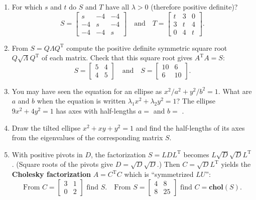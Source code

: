 \documentclass[14pt, a4paper]{article}
\begin{document}
\begin{enumerate}[resume]
    \item For which $s$ and $t$ do $S$ and $T$ have all $\lambda > 0$ (therefore positive definite)?
          \[
              S = \begin{bmatrix} s & -4 & -4 \\ -4 & s & -4 \\ -4 & -4 & s \end{bmatrix} \quad \text{and} \quad T = \begin{bmatrix} t & 3 & 0 \\ 3 & t & 4 \\ 0 & 4 & t \end{bmatrix}.
          \]

    \item From $S = Q\Lambda Q^{\mathrm{T}}$ compute the positive definite symmetric square root $Q\sqrt{\Lambda}Q^{\mathrm{T}}$ of each matrix. Check that this square root gives $A^{\mathrm{T}}A = S$:
          \[
              S = \begin{bmatrix} 5 & 4 \\ 4 & 5 \end{bmatrix} \quad \text{and} \quad S = \begin{bmatrix} 10 & 6 \\ 6 & 10 \end{bmatrix}.
          \]

    \item You may have seen the equation for an ellipse as $x^2/a^2 + y^2/b^2 = 1$. What are $a$ and $b$ when the equation is written $\lambda_1x^2 + \lambda_2y^2 = 1$? The ellipse $9x^2 + 4y^2 = 1$ has axes with half-lengths $a =$ \underline{\hspace{1cm}} and $b =$ \underline{\hspace{1cm}}.

    \item Draw the tilted ellipse $x^2 + xy + y^2 = 1$ and find the half-lengths of its axes from the eigenvalues of the corresponding matrix $S$.

    \item With positive pivots in $D$, the factorization $S = LDL^{\mathrm{T}}$ becomes $L\sqrt{D}\sqrt{D}L^{\mathrm{T}}$. (Square roots of the pivots give $D = \sqrt{D}\sqrt{D}$.) Then $C = \sqrt{D}L^{\mathrm{T}}$ yields the \textbf{Cholesky factorization} $A = C^{\mathrm{T}}C$ which is ``symmetrized $LU$'':
          \[
              \text{From } C = \begin{bmatrix} 3 & 1 \\ 0 & 2 \end{bmatrix} \text{ find } S. \quad \text{From } S = \begin{bmatrix} 4 & 8 \\ 8 & 25 \end{bmatrix} \text{ find } C = \textbf{chol}(S).
          \]


\end{enumerate}
\end{document}
